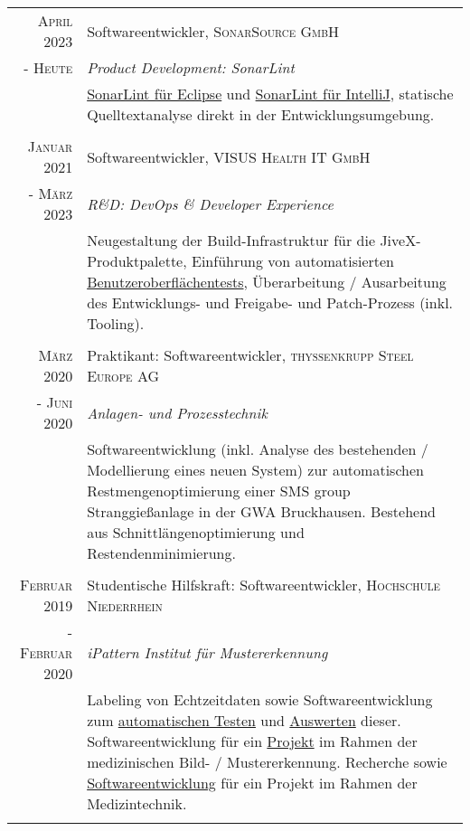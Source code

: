 \documentclass[10pt,a4paper]{article}
\begin{document}
\begin{tabular}{r|p{11cm}}
	\textsc{April} 2023 		& Softwareentwickler, \textsc{SonarSource GmbH} \\
	- \textsc{Heute} 		& \emph{Product Development: SonarLint} \\
						& \footnotesize{\href{https://www.sonarsource.com/products/sonarlint/features/eclipse/}{SonarLint f\"ur Eclipse} und \href{https://www.sonarsource.com/products/sonarlint/features/jetbrains/}{SonarLint f\"ur IntelliJ}, statische Quelltextanalyse direkt in der Entwicklungsumgebung.} \\
	\multicolumn{2}{c}{} \\
	
	\textsc{Januar} 2021 	& Softwareentwickler, \textsc{VISUS Health IT GmbH} \\
	- \textsc{M\"arz} 2023 	& \emph{R\&D: DevOps \& Developer Experience} \\
						& \footnotesize{Neugestaltung der Build-Infrastruktur f\"ur die JiveX-Produktpalette, Einf\"uhrung von automatisierten \href{https://www.qfs.de}{Benutzeroberfl\"achentests}, \"Uberarbeitung / Ausarbeitung des Entwicklungs- und Freigabe- und Patch-Prozess (inkl. Tooling).} \\
	\multicolumn{2}{c}{} \\
	
	\textsc{M\"arz} 2020 		& Praktikant: Softwareentwickler, \textsc{thyssenkrupp Steel Europe AG} \\
	- \textsc{Juni} 2020		& \emph{Anlagen- und Prozesstechnik} \\
						& \footnotesize{Softwareentwicklung (inkl. Analyse des bestehenden / Modellierung eines neuen System) zur automatischen Restmengenoptimierung einer SMS group Stranggie\ss anlage in der GWA Bruckhausen. Bestehend aus Schnittl\"angenoptimierung und Restendenminimierung.} \\
	\multicolumn{2}{c}{} \\

 	\textsc{Februar} 2019	& Studentische Hilfskraft: Softwareentwickler, \textsc{Hochschule Niederrhein} \\
	- \textsc{Februar} 2020	& \emph{iPattern Institut f\"ur Mustererkennung} \\
						& \footnotesize{Labeling von Echtzeitdaten sowie Softwareentwicklung zum \href{https://github.com/thahnen/labelbox-export-minifier}{automatischen Testen} und \href{https://github.com/thahnen/labelbox-scripts-etc}{Auswerten} dieser. Softwareentwicklung f\"ur ein \href{https://www.hs-niederrhein.de/ipattern/nachrichten-detailseite/?tx_news_pi1\%5Bnews\%5D=9545\&cHash=3202e26ca1ce23d3b3231df1f5c5a573}{Projekt} im Rahmen der medizinischen Bild- / Mustererkennung. Recherche sowie \href{https://github.com/thahnen/elastix-scripts-etc}{Softwareentwicklung} f\"ur ein Projekt im Rahmen der Medizintechnik.} \\
	\multicolumn{2}{c}{} \\
	

\end{tabular}
\end{document}
